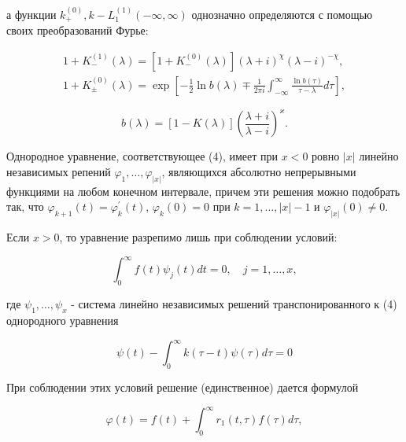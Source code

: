 \documentclass[10pt]{article}
\begin{document}
а функции $k_{+}^{(0)}, k-L_{1}^{(1)}(-\infty, \infty)$ однозначно определяются с помощью своих преобразований Фурье:



\[

\begin{gathered}

1+K_{-}^{(1)}(\lambda)=\left[1+K_{-}^{(0)}(\lambda)\right](\lambda+i)^{\chi}(\lambda-i)^{-\chi}, \\

1+K_{ \pm}^{(0)}(\lambda)=\exp \left[-\frac{1}{2} \ln b(\lambda) \mp \frac{1}{2 \pi i} \int_{-\infty}^{\infty} \frac{\ln b(\tau)}{\tau-\lambda} d \tau\right],

\end{gathered}

\]



\[

b(\lambda)=[1-K(\lambda)]\left(\frac{\lambda+i}{\lambda-i}\right)^{\varkappa} .

\]



Однородное уравнение, соответствующее (4), имеет при $x<0$ ровно $|x|$ линейно независимых репений $\varphi_{1}, \ldots, \varphi_{|x|}$, являющихся абсолютно непрерывными функциями на любом конечном интервале, причем эти решения можно подобрать так, что $\varphi_{k+1}(t)=\varphi_{k}^{\prime}(t)$, $\varphi_{k}(0)=0$ при $k=1, \ldots,|x|-1$ и $\varphi_{|x|}(0) \neq 0$.



Если $x>0$, то уравнение разрепимо лишь при соблюдении условий:



\[

\int_{0}^{\infty} f(t) \psi_{j}(t) d t=0, \quad j=1, \ldots, x,

\]



где $\psi_{1}, \ldots, \psi_{x}$ - система линейно независимых решений транспонированного к (4) однородного уравнения



\[

\psi(t)-\int_{0}^{\infty} k(\tau-t) \psi(\tau) d \tau=0

\]



При соблюдении этих условий решение (единственное) дается формулой



\[

\varphi(t)=f(t)+\int_{0}^{\infty} r_{1}(t, \tau) f(\tau) d \tau,

\]
\end{document}
